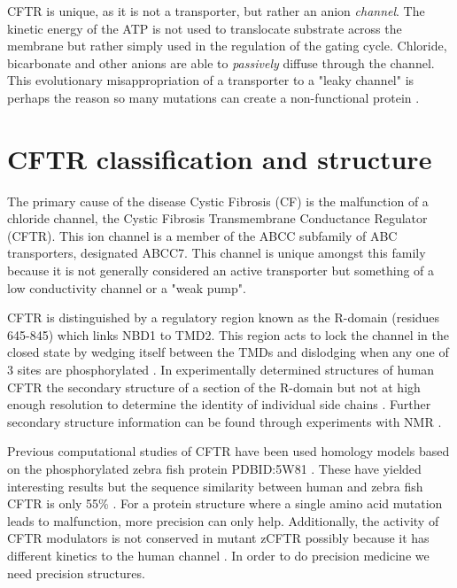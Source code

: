 CFTR is unique, as it is not a transporter, but rather an anion \textit{channel}. The kinetic energy of the ATP is not used to translocate substrate across the membrane but rather simply used in the regulation of the gating cycle. Chloride, bicarbonate and other anions are able to \textit{passively} diffuse through the channel. This evolutionary misappropriation of a transporter to a "leaky channel" is perhaps the reason so many mutations can create a non-functional protein \cite{linsdell2018}.

\section{CFTR classification and structure}

The primary cause of the disease Cystic Fibrosis (CF) is the malfunction of a chloride channel, the Cystic Fibrosis Transmembrane Conductance Regulator (CFTR). This ion channel is a member of the ABCC subfamily of ABC transporters, designated ABCC7. This channel is unique amongst this family because it is not generally considered an active transporter but something of a low conductivity channel or a "weak pump"\cite{linsdell2018}.

CFTR is distinguished by a regulatory region known as the R-domain (residues 645-845) which links NBD1 to TMD2. This region acts to lock the channel in the closed state by wedging itself between the TMDs and dislodging when any one of 3 sites are phosphorylated \cite{mihalyi2020}. In experimentally determined structures of human CFTR the secondary structure of a section of the R-domain but not at high enough resolution to determine the identity of individual side chains \cite{zhang2018}\cite{zhang2016}. Further secondary structure information can be found through experiments with NMR \cite{Baker2007}.

Previous computational studies of CFTR have been used homology models based on the phosphorylated zebra fish protein PDBID:5W81 \cite{zhang2017a}. These have yielded interesting results but the sequence similarity between human and zebra fish CFTR is only 55\% \cite{}. For a protein structure where a single amino acid mutation leads to malfunction, more precision can only help. Additionally, the activity of CFTR modulators is not conserved in mutant zCFTR possibly because it has different kinetics to the human channel \cite{}. In order to do precision medicine we need precision structures. 

